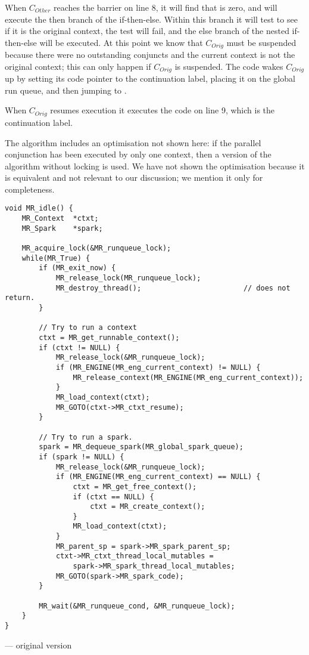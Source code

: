 \begin{description}
    When $C_{Other}$ reaches the barrier on line 8,
    it will find that  is zero,
    and will execute the then branch of the if-then-else.
    Within this branch it will test to see if it is the original
    context,
    the test will fail, and the else branch of the nested if-then-else
    will be executed.
    At this point we know that $C_{Orig}$ must be suspended because
    there were no outstanding conjuncts and the current context is not
    the original context;
    this can only happen if $C_{Orig}$ is suspended.
    The code wakes $C_{Orig}$ up by
    setting its code pointer to the continuation label,
    placing it on the global run queue,
    and then jumping to \idle.

    When $C_{Orig}$ resumes execution it executes the code on line 9,
    which is the continuation label.

\end{description}

The algorithm includes an optimisation not shown here:
if the parallel conjunction has been executed by only one context,
then a version of the algorithm without locking is used.
We have not shown the optimisation because it is equivalent and not relevant
to our discussion;
we mention it only for completeness.

\begin{algorithm}[tbp]
\begin{verbatim}
void MR_idle() {
    MR_Context  *ctxt;
    MR_Spark    *spark;
    
    MR_acquire_lock(&MR_runqueue_lock);
    while(MR_True) {
        if (MR_exit_now) {
            MR_release_lock(MR_runqueue_lock);
            MR_destroy_thread();                        // does not return.
        }

        // Try to run a context
        ctxt = MR_get_runnable_context();
        if (ctxt != NULL) { 
            MR_release_lock(&MR_runqueue_lock);
            if (MR_ENGINE(MR_eng_current_context) != NULL) {
                MR_release_context(MR_ENGINE(MR_eng_current_context));
            }
            MR_load_context(ctxt);
            MR_GOTO(ctxt->MR_ctxt_resume);
        }
    
        // Try to run a spark.
        spark = MR_dequeue_spark(MR_global_spark_queue);
        if (spark != NULL) {
            MR_release_lock(&MR_runqueue_lock);
            if (MR_ENGINE(MR_eng_current_context) == NULL) {
                ctxt = MR_get_free_context();
                if (ctxt == NULL) {
                    ctxt = MR_create_context();
                }
                MR_load_context(ctxt);
            }
            MR_parent_sp = spark->MR_spark_parent_sp;
            ctxt->MR_ctxt_thread_local_mutables =
                spark->MR_spark_thread_local_mutables;
            MR_GOTO(spark->MR_spark_code);
        }

        MR_wait(&MR_runqueue_cond, &MR_runqueue_lock);
    }
}
\end{verbatim}
\caption{\idle --- original version}
\label{alg:MR_idle_initial}
\end{algorithm}

